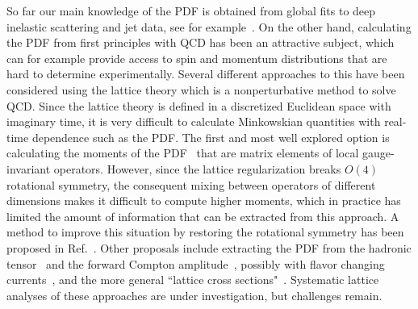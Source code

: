 So far our main knowledge of the PDF is obtained from global fits to deep inelastic scattering and jet data, see for example~\cite{Ball:2014uwa,Dulat:2015mca,Martin:2009iq,Alekhin:2017kpj,Buckley:2014ana}. On the other hand, calculating the PDF from first principles with QCD has been an attractive subject, which can for example provide access to spin and momentum distributions that are hard to determine experimentally. Several different approaches to this have been considered using the lattice theory which is a nonperturbative method to solve QCD. Since the lattice theory is defined in a discretized Euclidean space with imaginary time, it is very difficult to calculate Minkowskian quantities with real-time dependence such as the PDF. The first and most well explored option is calculating the moments of the PDF~\cite{Martinelli:1987zd,Martinelli:1988xs,Detmold:2001dv,Detmold:2002nf,Dolgov:2002zm} that are matrix elements of local gauge-invariant operators. However, since the lattice regularization breaks $O(4)$ rotational symmetry, the consequent mixing between operators of different dimensions makes it difficult to compute higher moments, which in practice has limited the amount of information that can be extracted from this approach. A method to improve this situation by restoring the rotational symmetry has been proposed in Ref.~\cite{Davoudi:2012ya}.
Other proposals include extracting the PDF from the hadronic tensor~\cite{Liu:1993cv,Liu:1998um,Liu:1999ak,Liu:2016djw} and the forward Compton amplitude~\cite{Chambers:2017dov}, possibly with flavor changing currents~\cite{Detmold:2005gg}, and the more general ``lattice cross sections"~\cite{Ma:2014jla,Ma:2017pxb}. Systematic lattice analyses of these approaches are  under investigation, but challenges remain.

